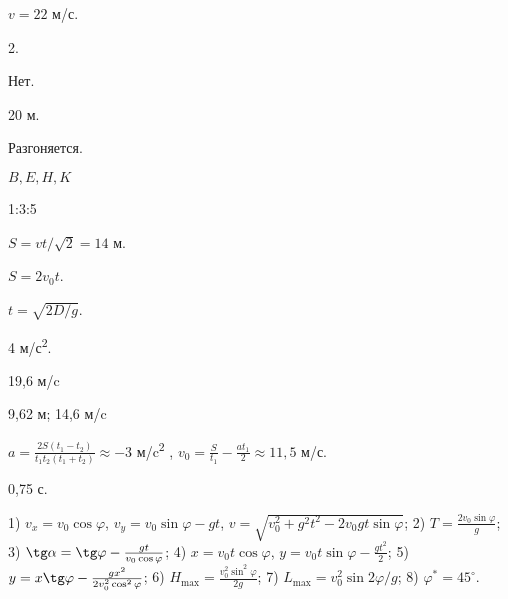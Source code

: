 \begin{Answer}{1}
$v = 22$ м/с.
\end{Answer}
\begin{Answer}{3}
2.
\end{Answer}
\begin{Answer}{4}
Нет.
\end{Answer}
\begin{Answer}{5}
20 м.
\end{Answer}
\begin{Answer}{6}
Разгоняется.
\end{Answer}
\begin{Answer}{7}
$B, E, H, K$
\end{Answer}
\begin{Answer}{8}
1:3:5
\end{Answer}
\begin{Answer}{11}
$S = vt/\sqrt{2} = 14$ м.
\end{Answer}
\begin{Answer}{12}
$S = 2 v_0 t$.
\end{Answer}
\begin{Answer}{13}
$t = \sqrt{2D/g}$.
\end{Answer}
\begin{Answer}{15}
4 м/с\textsuperscript{2}.
\end{Answer}
\begin{Answer}{17}
19,6 м/c
\end{Answer}
\begin{Answer}{18}
9,62 м; 14,6 м/c
\end{Answer}
\begin{Answer}{19}
$a = \frac{2S\left(t_1-t_2\right)}{t_1t_2\left(t_1+t_2\right)} \approx -3$ м/c\textsuperscript{2} , $v_0 = \frac{S}{t_1}-\frac{at_1}{2} \approx 11,5$ м/с.
\end{Answer}
\begin{Answer}{20}
0,75 с.
\end{Answer}
\begin{Answer}{21}
1) $v_x = v_0 \cos \varphi$, $v_y = v_0 \sin \varphi - gt$, $v = \sqrt{v_{0}^{2} + g^2 t^2 - 2v_{0}gt \sin \varphi}$; 2) $T = \frac{2v_{0}\sin \varphi}{g}$; 3) $ \tg \alpha = \tg \varphi - \frac{gt}{v_0 \cos \varphi}$; 4) $x = v_0 t \cos \varphi$, $y = v_0 t \sin \varphi - \frac{gt^2}{2}$; 5) $y = x \tg \varphi - \frac{gx^2}{2v_{0}^{2} \cos^2 \varphi} $; 6) $H_{\max} = \frac{v_{0}^{2} \sin^2 \varphi}{2g}$; 7) $L_{\max} = v_{0}^2 \sin 2 \varphi / g$; 8) $\varphi^{*} = 45^{\circ}$.
\end{Answer}

